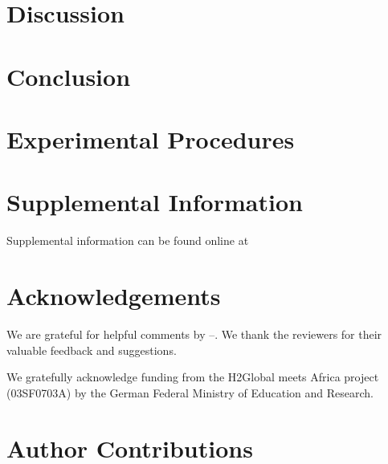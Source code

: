 \documentclass[5p]{elsarticle}
\begin{document}


\section*{Discussion}
\label{sec:discussion}



\section*{Conclusion}
\label{sec:conclusion}



\section*{Experimental Procedures}
\label{sec:methods}








\section*{Supplemental Information}

Supplemental information can be found online at %

\section*{Acknowledgements}

We are grateful for helpful comments by --. We thank the
reviewers for their valuable feedback and suggestions.

We gratefully acknowledge funding from the H2Global meets Africa project (03SF0703A) by the German Federal Ministry of Education and Research.

\section*{Author Contributions}
\end{document}

